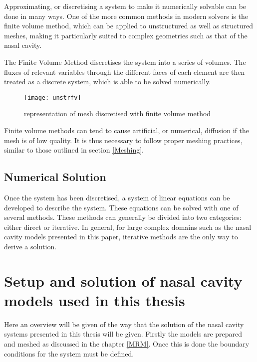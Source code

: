 Approximating, or discretising a system to make it numerically solvable can be done in many ways. One of the more common methods in modern solvers is the finite volume method, which can be applied to unstructured as well as structured meshes, making it particularly suited to complex geometries such as that of the nasal cavity.

The Finite Volume Method discretises the system into a series of volumes. The fluxes of relevant variables through the different faces of each element are then treated as a discrete system, which is able to be solved numerically.

\begin{figure}
  \texttt{[image: unstrfv]}
  \caption{representation of mesh discretised with finite volume method}
  \label{usfv}
\end{figure}

Finite volume methods can tend to cause artificial, or numerical, diffusion if the mesh is of low quality. It is thus necessary to follow proper meshing practices, similar to those outlined in section \ref{Meshing}.

\subsection{Numerical Solution}

Once the system has been discretised, a system of linear equations can be developed to describe the system. These equations can be solved with one of several methods. These methods can generally be divided into two categories: either direct or iterative. In general, for large complex domains such as the nasal cavity models presented in this paper, iterative methods are the only way to derive a solution.

\section{Setup and solution of nasal cavity models used in this thesis}
Here an overview will be given of the way that the solution of the nasal cavity systems presented in this thesis will be given. Firstly the models are prepared and meshed as discussed in the chapter \ref{MRM}. Once this is done the boundary conditions for the system must be defined. 


